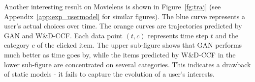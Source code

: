 \documentclass{article} %
\begin{document}
\begin{table}[ht!]
\vspace{-3mm}
\begin{center}
    \caption{{\small GAN user model with SE (Shannon entropy) versus $L_2$ regularization on Yelp dataset.}}
\label{tb:user_model2}
\vspace{-3mm}
\end{center}
\vspace{-4mm}
\end{table}

Another interesting result on Movielens is shown in Figure~\ref{fg:traj} (see Appendix~\ref{app:exp_usermodel} for similar figures). The blue curve represents a user's actual choices over time. The orange curves are trajectories predicted by {\small GAN} and {\small W\&D-CCF}. Each data point $(t, c)$ represents time step $t$ and the category $c$ of the clicked item.  The upper sub-figure shows that {\small GAN} performs much better as time goes by, while the items predicted by {\small W\&D-CCF} in the lower sub-figure are concentrated on several categories. This indicates a drawback of static models - it fails to capture the evolution of a user's interests. 
\end{document}
